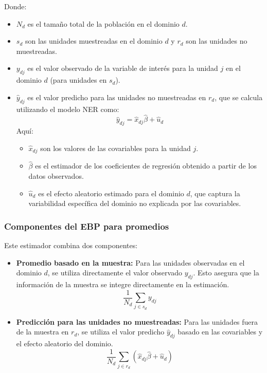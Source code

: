 \documentclass[12pt,spanish]{article}
\begin{document}
Donde:
\begin{itemize}
    \item $N_d$ es el tamaño total de la población en el dominio $d$.
    \item $s_d$ son las unidades muestreadas en el dominio $d$ y $r_d$ son las unidades no muestreadas.
    \item $y_{dj}$ es el valor observado de la variable de interés para la unidad $j$ en el dominio $d$ (para unidades en $s_d$).
    \item $\hat{y}_{dj}$ es el valor predicho para las unidades no muestreadas en $r_d$, que se calcula utilizando el modelo NER como:
    \[
    \hat{y}_{dj} = \hat{x}_{dj} \hat{\beta} + \hat{u}_d
    \]
    Aquí:
    \begin{itemize}
        \item $\hat{x}_{dj}$ son los valores de las covariables para la unidad $j$.
        \item $\hat{\beta}$ es el estimador de los coeficientes de regresión obtenido a partir de los datos observados.
        \item $\hat{u}_d$ es el efecto aleatorio estimado para el dominio $d$, que captura la variabilidad específica del dominio no explicada por las covariables.
    \end{itemize}
\end{itemize}

\subsubsection*{Componentes del EBP para promedios}

Este estimador combina dos componentes:

\begin{itemize}
    \item \textbf{Promedio basado en la muestra:} Para las unidades observadas en el dominio $d$, se utiliza directamente el valor observado $y_{dj}$. Esto asegura que la información de la muestra se integre directamente en la estimación.
    \[
    \frac{1}{N_d} \sum_{j \in s_d} y_{dj}
    \]

    \item \textbf{Predicción para las unidades no muestreadas:} Para las unidades fuera de la muestra en $r_d$, se utiliza el valor predicho $\hat{y}_{dj}$ basado en las covariables y el efecto aleatorio del dominio.
    \[
    \frac{1}{N_d} \sum_{j \in r_d} (\hat{x}_{dj} \hat{\beta} + \hat{u}_d)
    \]
\end{itemize}
\end{document}
